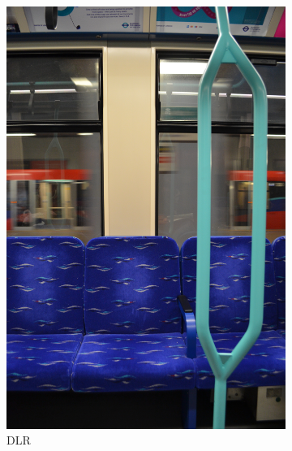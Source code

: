 \begin{figure}[H]
\begin{subfigure}[b]{0.22\textwidth}
        \includegraphics[width=\textwidth]{guidance-example-section/images/rathbone2017dlr.jpg}
        \caption{DLR \parencite{rathbone2017dlr}}
        \label{fig:rathbone2017dlr}
    \end{subfigure}
    \hfill
    \begin{subfigure}[b]{0.22\textwidth}
        \centering

\end{subfigure}
\end{figure}
